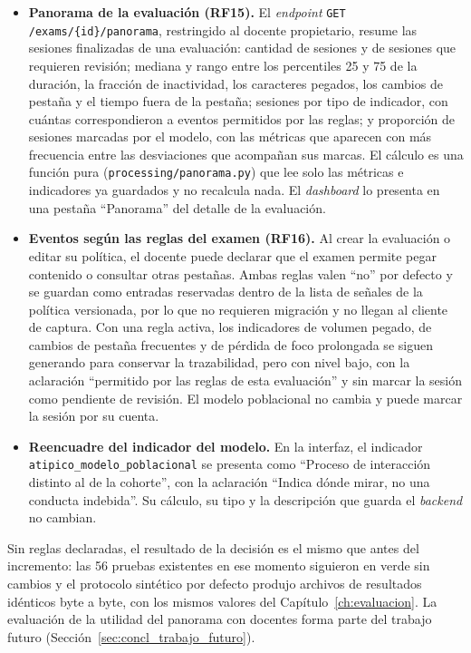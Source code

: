 \begin{itemize}
    \item \textbf{Panorama de la evaluación (RF15).} El \textit{endpoint} \texttt{GET /exams/\{id\}/panorama}, restringido al docente propietario, resume las sesiones finalizadas de una evaluación: cantidad de sesiones y de sesiones que requieren revisión; mediana y rango entre los percentiles 25 y 75 de la duración, la fracción de inactividad, los caracteres pegados, los cambios de pestaña y el tiempo fuera de la pestaña; sesiones por tipo de indicador, con cuántas correspondieron a eventos permitidos por las reglas; y proporción de sesiones marcadas por el modelo, con las métricas que aparecen con más frecuencia entre las desviaciones que acompañan sus marcas. El cálculo es una función pura (\texttt{processing/panorama.py}) que lee solo las métricas e indicadores ya guardados y no recalcula nada. El \textit{dashboard} lo presenta en una pestaña ``Panorama'' del detalle de la evaluación.
    \item \textbf{Eventos según las reglas del examen (RF16).} Al crear la evaluación o editar su política, el docente puede declarar que el examen permite pegar contenido o consultar otras pestañas. Ambas reglas valen ``no'' por defecto y se guardan como entradas reservadas dentro de la lista de señales de la política versionada, por lo que no requieren migración y no llegan al cliente de captura. Con una regla activa, los indicadores de volumen pegado, de cambios de pestaña frecuentes y de pérdida de foco prolongada se siguen generando para conservar la trazabilidad, pero con nivel bajo, con la aclaración ``permitido por las reglas de esta evaluación'' y sin marcar la sesión como pendiente de revisión. El modelo poblacional no cambia y puede marcar la sesión por su cuenta.
    \item \textbf{Reencuadre del indicador del modelo.} En la interfaz, el indicador \texttt{atipico\_modelo\_poblacional} se presenta como ``Proceso de interacción distinto al de la cohorte'', con la aclaración ``Indica dónde mirar, no una conducta indebida''. Su cálculo, su tipo y la descripción que guarda el \textit{backend} no cambian.
\end{itemize}

Sin reglas declaradas, el resultado de la decisión es el mismo que antes del incremento: las 56 pruebas existentes en ese momento siguieron en verde sin cambios y el protocolo sintético por defecto produjo archivos de resultados idénticos byte a byte, con los mismos valores del Capítulo~\ref{ch:evaluacion}. La evaluación de la utilidad del panorama con docentes forma parte del trabajo futuro (Sección~\ref{sec:concl_trabajo_futuro}).

